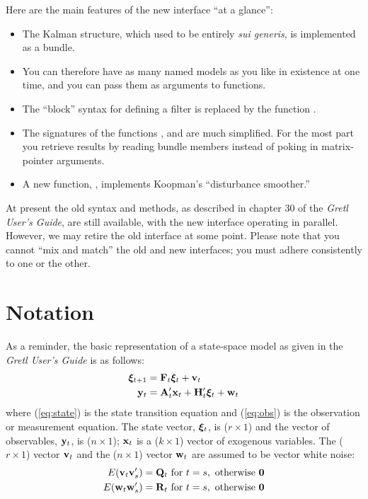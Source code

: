 \documentclass[a4paper]{article}
\begin{document}
Here are the main features of the new interface ``at a glance'':
%
\begin{itemize}
\item The Kalman structure, which used to be entirely \textit{sui
    generis}, is implemented as a bundle.
\item You can therefore have as many named models as you like in
  existence at one time, and you can pass them as arguments to
  functions.
\item The ``block'' syntax for defining a filter is replaced by the
  function .
\item The signatures of the functions ,
   and  are much simplified. For the
  most part you retrieve results by reading bundle members instead of
  poking in matrix-pointer arguments.
\item A new function, , implements Koopman's
  ``disturbance smoother.''
\end{itemize}

At present the old syntax and methods, as described in chapter 30 of
the \textit{Gretl User's Guide}, are still available, with the new
interface operating in parallel. However, we may retire the old
interface at some point. Please note that you cannot ``mix and match''
the old and new interfaces; you must adhere consistently to one or the
other.

\section{Notation}

As a reminder, the basic representation of a state-space model as
given in the \textit{Gretl User's Guide} is as follows:
%
\begin{align}
  \label{eq:state}
  \bm{\xi}_{t+1} &= \mathbf{F}_t \bm{\xi}_t + \mathbf{v}_t \\
  \label{eq:obs}
  \mathbf{y}_t &= \mathbf{A}_t'\mathbf{x}_t + \mathbf{H}_t' \bm{\xi}_t +
  \mathbf{w}_t 
\end{align}
%
where (\ref{eq:state}) is the state transition equation and
(\ref{eq:obs}) is the observation or measurement equation.  The state
vector, $\bm{\xi}_{t}$, is ($r \times 1$) and the vector of
observables, $\mathbf{y}_t$, is ($n \times 1$); $\mathbf{x}_t$ is a ($k
\times 1$) vector of exogenous variables.  The ($r \times 1$) vector
$\mathbf{v}_t$ and the ($n \times 1$) vector $\mathbf{w}_t$ are assumed to
be vector white noise:
%
\begin{align*}
E(\mathbf{v}_t \mathbf{v}_s') &= \mathbf{Q}_t \mbox{ for } t = s, 
    \mbox{ otherwise } \mathbf{0} \\
E(\mathbf{w}_t \mathbf{w}_s') &= \mathbf{R}_t \mbox{ for } t = s, 
    \mbox{ otherwise } \mathbf{0}
\end{align*}
\end{document}
